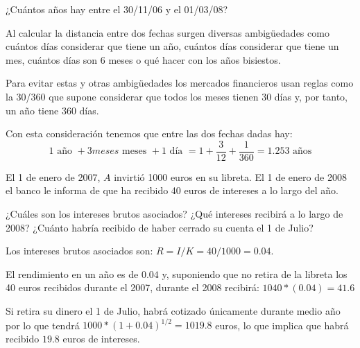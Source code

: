 \begin{problem}[1]
¿Cuántos años hay entre el 30/11/06 y el 01/03/08?
\solution

Al calcular la distancia entre dos fechas surgen diversas ambigüedades como cuántos días considerar que tiene un año, cuántos días considerar que tiene un mes, cuántos días son 6 meses o qué hacer con los años bisiestos.

Para evitar estas y otras ambigüedades los mercados financieros usan reglas como la 30/360 que supone considerar que todos los meses tienen 30 días y, por tanto, un año tiene 360 días.

Con esta consideración tenemos que entre las dos fechas dadas hay:
\[1 \text{ año } + 3 meses \text{ meses } + 1 \text{ día } = 1 + \frac{3}{12} + \frac{1}{360} = 1.253 \text{ años}\]

\end{problem}

\begin{problem}[2]
El 1 de enero de 2007, $A$ invirtió 1000 euros en su libreta. El 1 de enero de 2008 el banco le informa de que ha recibido 40 euros de intereses a lo largo del año.

\ppart ¿Cuáles son los intereses brutos asociados?
\ppart ¿Qué intereses recibirá a lo largo de 2008?
\ppart ¿Cuánto habría recibido de haber cerrado su cuenta el 1 de Julio?
\solution

\spart
Los intereses brutos asociados son: $R = I/K = 40/1000 = 0.04$.

\spart
El rendimiento en un año es de $0.04$ y, suponiendo que no retira de la libreta los 40 euros recibidos durante el 2007, durante el 2008 recibirá: $1040*(0.04)=41.6$

\spart
Si retira su dinero el 1 de Julio, habrá cotizado únicamente durante medio año por lo que tendrá $1000*(1+0.04)^{1/2} = 1019.8$ euros, lo que implica que habrá recibido $19.8$ euros de intereses.

\end{problem}

